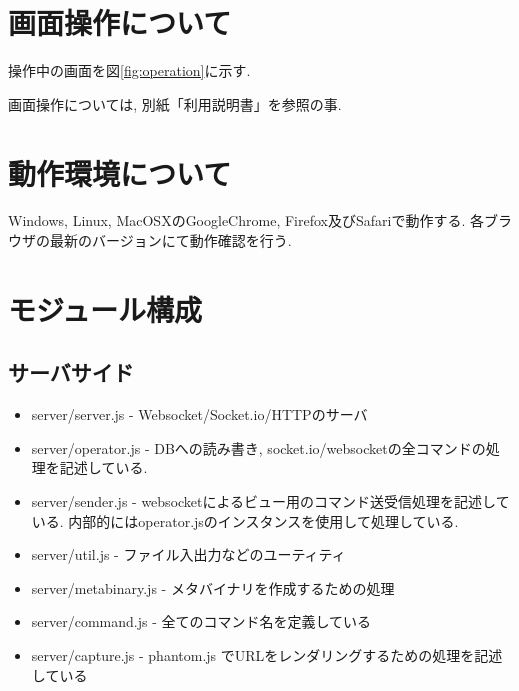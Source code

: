 \documentclass[a4paper,10pt,oneside]{jsbook}
\begin{document}
\chapter{画面操作について}

操作中の画面を図\ref{fig:operation}に示す. 

画面操作については, 別紙「利用説明書」を参照の事.


\chapter{動作環境について}
Windows, Linux, MacOSXのGoogleChrome, Firefox及びSafariで動作する.
各ブラウザの最新のバージョンにて動作確認を行う.



\chapter{モジュール構成}
\section{サーバサイド}
\begin{itemize}
\item server/server.js  - Websocket/Socket.io/HTTPのサーバ
\item server/operator.js - DBへの読み書き, socket.io/websocketの全コマンドの処理を記述している.
\item server/sender.js - websocketによるビュー用のコマンド送受信処理を記述している. 内部的にはoperator.jsのインスタンスを使用して処理している.
\item server/util.js - ファイル入出力などのユーティティ
\item server/metabinary.js - メタバイナリを作成するための処理
\item server/command.js - 全てのコマンド名を定義している
\item server/capture.js - phantom.js でURLをレンダリングするための処理を記述している
\end{itemize}
\end{document}
